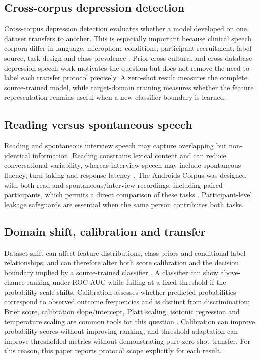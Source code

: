 \documentclass[lettersize,journal]{IEEEtran}
\begin{document}
\subsection{Cross-corpus depression detection}

Cross-corpus depression detection evaluates whether a model developed on one dataset transfers to another. This is especially important because clinical speech corpora differ in language, microphone conditions, participant recruitment, label source, task design and class prevalence \cite{alghowinem2016crossCultural,seneviratne2021generalized,leal2025survey}. Prior cross-cultural and cross-database depression-speech work motivates the question but does not remove the need to label each transfer protocol precisely. A zero-shot result measures the complete source-trained model, while target-domain training measures whether the feature representation remains useful when a new classifier boundary is learned.

\subsection{Reading versus spontaneous speech}

Reading and spontaneous interview speech may capture overlapping but non-identical information. Reading constrains lexical content and can reduce conversational variability, whereas interview speech may include spontaneous fluency, turn-taking and response latency \cite{tao2023androids,tao2023featureCorrelation,leal2025survey}. The Androids Corpus was designed with both read and spontaneous/interview recordings, including paired participants, which permits a direct comparison of these tasks \cite{tao2023androids}. Participant-level leakage safeguards are essential when the same person contributes both tasks.

\subsection{Domain shift, calibration and transfer}

Dataset shift can affect feature distributions, class priors and conditional label relationships, and can therefore alter both score calibration and the decision boundary implied by a source-trained classifier \cite{morenoTorres2012datasetShift}. A classifier can show above-chance ranking under ROC-AUC while failing at a fixed threshold if the probability scale shifts. Calibration assesses whether predicted probabilities correspond to observed outcome frequencies and is distinct from discrimination; Brier score, calibration slope/intercept, Platt scaling, isotonic regression and temperature scaling are common tools for this question \cite{brier1950probabilityForecasts,niculescuMizil2005probabilities,guo2017calibration,vanCalster2019calibration}. Calibration can improve probability scores without improving ranking, and threshold adaptation can improve thresholded metrics without demonstrating pure zero-shot transfer. For this reason, this paper reports protocol scope explicitly for each result.
\end{document}
